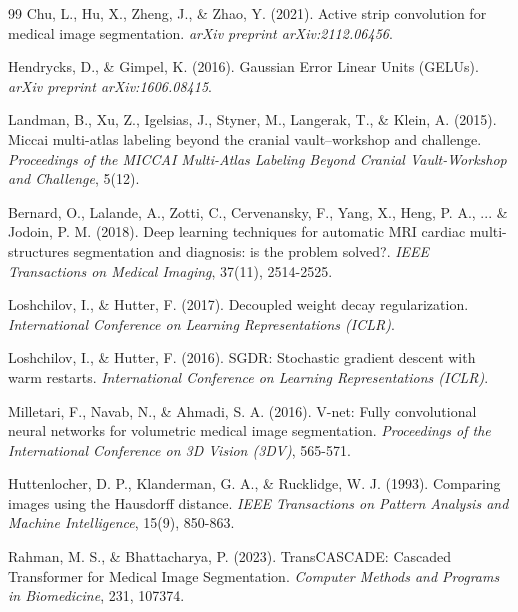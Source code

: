 \documentclass[runningheads]{llncs}
\begin{document}
\begin{thebibliography}{99}
Chu, L., Hu, X., Zheng, J., \& Zhao, Y. (2021). Active strip convolution for medical image segmentation. \textit{arXiv preprint arXiv:2112.06456}.

Hendrycks, D., \& Gimpel, K. (2016). Gaussian Error Linear Units (GELUs). \textit{arXiv preprint arXiv:1606.08415}.




Landman, B., Xu, Z., Igelsias, J., Styner, M., Langerak, T., \& Klein, A. (2015). Miccai multi-atlas labeling beyond the cranial vault--workshop and challenge. \textit{Proceedings of the MICCAI Multi-Atlas Labeling Beyond Cranial Vault-Workshop and Challenge}, 5(12).

Bernard, O., Lalande, A., Zotti, C., Cervenansky, F., Yang, X., Heng, P. A., ... \& Jodoin, P. M. (2018). Deep learning techniques for automatic MRI cardiac multi-structures segmentation and diagnosis: is the problem solved?. \textit{IEEE Transactions on Medical Imaging}, 37(11), 2514-2525.

Loshchilov, I., \& Hutter, F. (2017). Decoupled weight decay regularization. \textit{International Conference on Learning Representations (ICLR)}.

Loshchilov, I., \& Hutter, F. (2016). SGDR: Stochastic gradient descent with warm restarts. \textit{International Conference on Learning Representations (ICLR)}.

Milletari, F., Navab, N., \& Ahmadi, S. A. (2016). V-net: Fully convolutional neural networks for volumetric medical image segmentation. \textit{Proceedings of the International Conference on 3D Vision (3DV)}, 565-571.

Huttenlocher, D. P., Klanderman, G. A., \& Rucklidge, W. J. (1993). Comparing images using the Hausdorff distance. \textit{IEEE Transactions on Pattern Analysis and Machine Intelligence}, 15(9), 850-863.



Rahman, M. S., \& Bhattacharya, P. (2023). TransCASCADE: Cascaded Transformer for Medical Image Segmentation. \textit{Computer Methods and Programs in Biomedicine}, 231, 107374.


\end{thebibliography}
\end{document}

